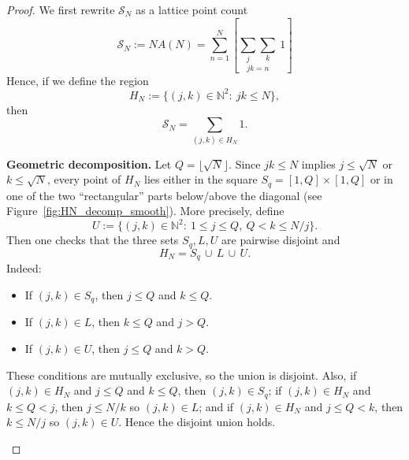 \documentclass{elegantbook}
\begin{document}
\begin{proof}
  We first rewrite \(\mathcal{S}_N\) as a lattice point count
  \[
    \mathcal{S}_N := N A(N) = \sum_{n=1}^{N} \left[\underset{jk=n}{\sum_{j}\sum_{k}}\ 1 \right]
  \]
  Hence, if we define the region
  \[
    H_N:=\{(j,k)\in\mathbb N^2:\ jk\le N\},
  \]
  then
  \[
    \mathcal{S}_N=\sum_{(j,k)\in H_N}1.
  \]

  \medskip
  \noindent\textbf{Geometric decomposition.}
  Let \(Q=\lfloor\sqrt N\rfloor\). Since \(jk\le N\) implies \(j\le \sqrt N\) or \(k\le \sqrt N\),
  every point of \(H_N\) lies either in the square \(S_q=[1,Q]\times[1,Q]\) or in one of the two
  ``rectangular'' parts below/above the diagonal (see Figure~\ref{fig:HN_decomp_smooth}).
  More precisely, define
  \[
    U := \{(j,k)\in\mathbb N^2:\ 1\le j\le Q,\ Q< k\le N/j\}.
  \]
  Then one checks that the three sets \(S_q,L,U\) are pairwise disjoint and
  \[
    H_N = S_q \,\cup\, L \,\cup\, U.
  \]
  Indeed:
  \begin{itemize}
    \item If \((j,k)\in S_q\), then \(j\le Q\) and \(k\le Q\).
    \item If \((j,k)\in L\), then \(k\le Q\) and \(j>Q\).
    \item If \((j,k)\in U\), then \(j\le Q\) and \(k>Q\).
  \end{itemize}
  These conditions are mutually exclusive, so the union is disjoint. Also, if \((j,k)\in H_N\) and
  \(j\le Q\) and \(k\le Q\), then \((j,k)\in S_q\); if \((j,k)\in H_N\) and \(k\le Q<j\), then
  \(j\le N/k\) so \((j,k)\in L\); and if \((j,k)\in H_N\) and \(j\le Q<k\), then \(k\le N/j\) so
  \((j,k)\in U\). Hence the disjoint union holds.


  \begin{figure}[ht]
  \centering
\end{figure}
\end{proof}
\end{document}

